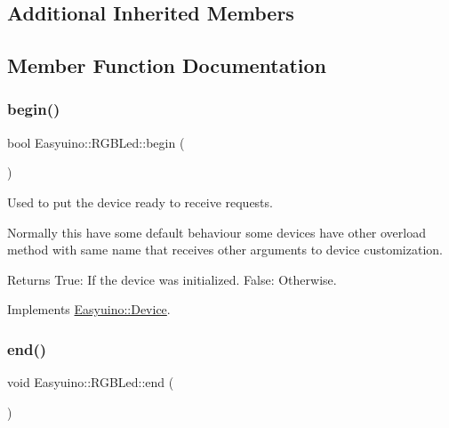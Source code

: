 \subsection*{Additional Inherited Members}


\subsection{Member Function Documentation}
\mbox{\label{class_easyuino_1_1_r_g_b_led_abdc3512266c7f584609147fccc1ec816}} 
\subsubsection{\texorpdfstring{begin()}{begin()}}
{\footnotesize\ttfamily bool Easyuino\+::\+R\+G\+B\+Led\+::begin (\begin{DoxyParamCaption}{ }\end{DoxyParamCaption})\hspace{0.3cm}{\ttfamily [virtual]}}



Used to put the device ready to receive requests. 

Normally this have some default behaviour some devices have other overload method with same name that receives other arguments to device customization. \begin{DoxyReturn}{Returns}
True\+: If the device was initialized. False\+: Otherwise. 
\end{DoxyReturn}


Implements \hyperlink{class_easyuino_1_1_device_a2e7bb2fec849719a9d9432b57cdb72ba}{Easyuino\+::\+Device}.

\mbox{\label{class_easyuino_1_1_r_g_b_led_ad0e9fb0da405c537e876c8a2dc22246e}} 
\subsubsection{\texorpdfstring{end()}{end()}}
{\footnotesize\ttfamily void Easyuino\+::\+R\+G\+B\+Led\+::end (\begin{DoxyParamCaption}{ }\end{DoxyParamCaption})\hspace{0.3cm}{\ttfamily [virtual]}}



